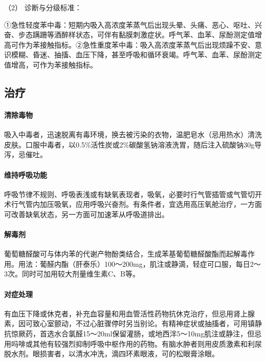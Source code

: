 \hypertarget{text00153.htmlux5cux23CHP5-5-3-2-3-2}{}
（2） 诊断与分级标准：

①急性轻度苯中毒：短期内吸入高浓度苯蒸气后出现头晕、头痛、恶心、呕吐、兴奋、步态蹒跚等酒醉样状态，可伴有黏膜刺激症状。呼气苯、血苯、尿酚测定值增高可作为苯接触指标。②急性重度苯中毒：吸入高浓度苯蒸气后出现烦躁不安、意识模糊、昏迷、抽搐、血压下降，甚至呼吸和循环衰竭。呼气苯、血苯、尿酚测定值增高，可作为苯接触指标。

\subsection{治疗}

\paragraph{清除毒物}

吸入中毒者，迅速脱离有毒环境，换去被污染的衣物，温肥皂水（忌用热水）清洗皮肤。口服中毒者，以0.5\%活性炭或2\%碳酸氢钠溶液洗胃，随后注入硫酸钠30g导泻，忌催吐。

\paragraph{维持呼吸功能}

呼吸节律不规则、呼吸表浅或有缺氧表现者，吸氧，必要时行气管插管或气管切开术行气管内加压吸氧，应用呼吸兴奋剂。有条件者，宜选用高压氧舱治疗，一方面可改善缺氧状态，另一方面可加速苯从呼吸道排出。

\paragraph{解毒剂}

葡萄糖醛酸可与体内苯的代谢产物酚类结合，生成苯基葡萄糖醛酸酯而起解毒作用。用法：葡醛内酯（肝泰乐）100～200mg，肌注或静滴，轻症可口服，每日2～3次。同时可加用较大剂量维生素C、B等。

\paragraph{对症处理}

有血压下降或休克者，补充血容量和用血管活性药物抗休克治疗，但忌用肾上腺素，因可致心室颤动，不过心脏骤停时另当别论。有精神症状或抽搐者，可用镇静抗惊厥药，首选水合氯醛15～20ml保留灌肠，或地西泮5～10mg肌注或静注，但忌用吗啡或其他有较强烈抑制呼吸中枢作用的药物。有脑水肿者则用皮质激素和利尿脱水剂。眼损害者，以清水冲洗，滴四环素眼液，可的松眼膏涂眼。

